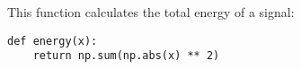 
\item[(e)]
This function calculates the total energy of a signal:

\begin{verbatim}
def energy(x):
    return np.sum(np.abs(x) ** 2)
\end{verbatim}
